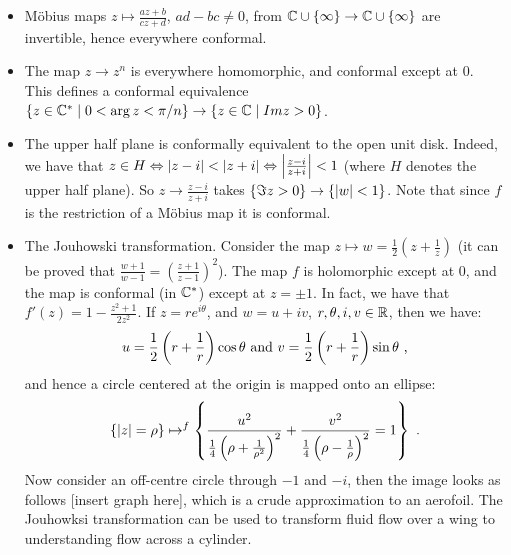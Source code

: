 \begin{itemize}
\item Möbius maps $z \mapsto \frac{az+b}{cz+d}$, $ad - bc \neq 0$, from $\CC \cup \{ \infty \} \rightarrow \CC \cup \{ \infty \}$ are invertible, hence everywhere conformal.
\item The map $z \rightarrow z^n$ is everywhere homomorphic, and conformal except at $0$. This defines a conformal equivalence $\{ z \in \CC^* \mid 0 < \arg z < \pi/n \} \rightarrow \{ z \in \CC \mid Im z > 0 \}$.
\item The upper half plane is conformally equivalent to the open unit disk. Indeed, we have that $z \in H \Leftrightarrow \abs{z - i} < \abs{z + i} \Leftrightarrow \abs*{\frac{z-i}{z+i}} < 1$ (where $H$ denotes the upper half plane). So $z \rightarrow \frac{z-i}{z+i}$ takes $\{ \Im z > 0 \} \rightarrow \{ \abs{w} < 1 \}$. Note that since $f$ is the restriction of a Möbius map it is conformal.
\item The Jouhowski transformation. Consider the map $z \mapsto w = \frac{1}{2}\left(z + \frac{1}{z}\right)$ (it can be proved that $\frac{w + 1}{w - 1} = \left(\frac{z + 1}{z - 1}\right)^2$). 
The map $f$ is holomorphic except at $0$, and the map is conformal (in $\CC^*$) except at $z = \pm 1$. 
In fact, we have that $f'(z) = 1 - \frac{z^2 + 1}{2z^2}$. If $z = re^{i\theta}$, and $w = u + iv$, $r, \theta, i, v \in \RR$, then we have:
\[
u = \frac{1}{2}\left(r + \frac{1}{r}\right)\cos \theta \text{ and } v = \frac{1}{2}\left(r + \frac{1}{r}\right)\sin \theta \mpunct{,}
\]
and hence a circle centered at the origin is mapped onto an ellipse:
\[
\{ \abs{z} = \rho \} \mapsto^f \left\{ \frac{u^2}{\frac{1}{4}\left(\rho + \frac{1}{\rho^2}\right)^2} + \frac{v^2}{\frac{1}{4}\left(\rho - \frac{1}{\rho}\right)^2} = 1 \right\} \mpunct{.}
\]
Now consider an off-centre circle through $-1$ and $-i$, then the image looks as follows [insert graph here], which is a crude approximation to an aerofoil. The Jouhowksi transformation can be used to transform fluid flow over a wing to understanding flow across a cylinder.
\end{itemize}

